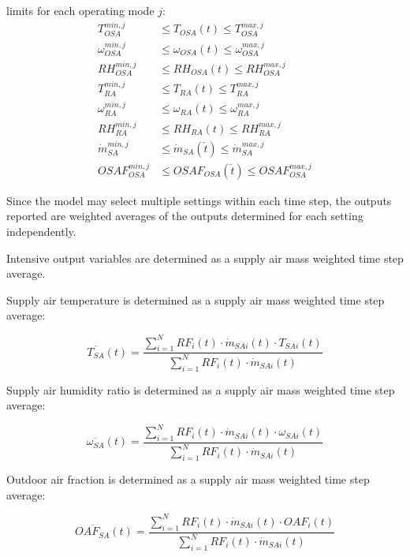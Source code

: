 limits for each operating mode $j$:
\begin{align}
	T_{OSA}^{min,j} & \leq T_{OSA}(t) \leq T_{OSA}^{max,j} \\
	\omega_{OSA}^{min,j} & \leq \omega_{OSA}(t) \leq \omega_{OSA}^{max,j} \\
	RH_{OSA}^{min,j} & \leq RH_{OSA}(t) \leq RH_{OSA}^{max,j} \\
	T_{RA}^{min,j} & \leq T_{RA}(t) \leq T_{RA}^{max,j} \\
	\omega_{RA}^{min,j} & \leq \omega_{RA}(t) \leq \omega_{RA}^{max,j} \\
	RH_{RA}^{min,j} & \leq RH_{RA}(t) \leq RH_{RA}^{max,j} \\
	\dot{m}_{SA}^{min,j} & \leq \dot{m}_{SA}(\check{t}) \leq \dot{m}_{SA}^{max,j} \\
	OSAF_{OSA}^{min,j} & \leq OSAF_{OSA}(\check{t}) \leq OSAF_{OSA}^{max,j}
\end{align}

Since the model may select multiple settings within each time step, the outputs reported are weighted averages of the outputs determined for each setting independently.

Intensive output variables are determined as a supply air mass weighted time step average.

Supply air temperature is determined as a supply air mass weighted time step average:

\begin{equation}
	\overline{T_{SA}}(t) = \frac{\sum_{i=1}^{N}RF_{i}(t) \cdot \dot{m}_{SAi}(t) \cdot T_{SAi}(t)} {\sum_{i=1}^{N}RF_{i}(t) \cdot \dot{m}_{SAi}(t)}
\end{equation}

Supply air humidity ratio is determined as a supply air mass weighted time step average:

\begin{equation}
	\overline{\omega_{SA}}(t) = \frac{\sum_{i=1}^{N}RF_{i}(t) \cdot \dot{m}_{SAi}(t) \cdot \omega_{SAi}(t)} {\sum_{i=1}^{N}RF_{i}(t) \cdot \dot{m}_{SAi}(t)}
\end{equation}

Outdoor air fraction is determined as a supply air mass weighted time step average:

\begin{equation}
	\overline{OAF_{SA}}(t) = \frac{\sum_{i=1}^{N}RF_{i}(t) \cdot \dot{m}_{SAi}(t) \cdot OAF_{i}(t)} {\sum_{i=1}^{N}RF_{i}(t) \cdot \dot{m}_{SAi}(t)}
\end{equation}

